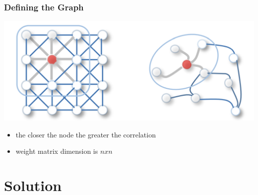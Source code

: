 \documentclass{beamer}
\begin{document}
\begin{frame}
  \frametitle{Defining the Graph}
  \includegraphics[width=\textwidth]{img/convolution.png}
  \begin{itemize}
    \item the closer the node the greater the correlation
    \item weight matrix dimension is $nxn$
  \end{itemize}
\end{frame}

\section{Solution}
\end{document}
